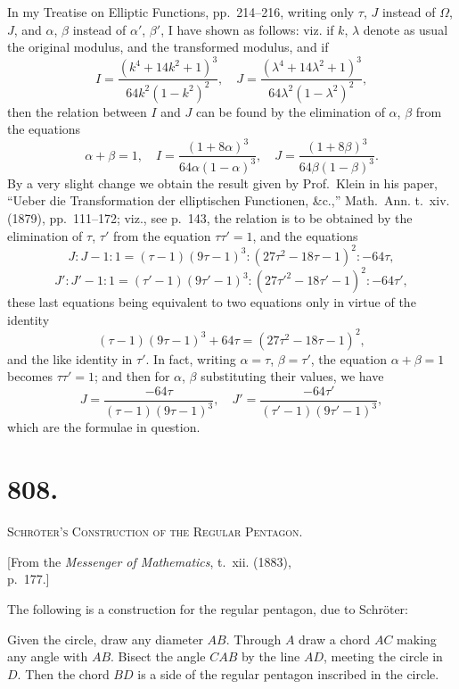 \documentclass[11pt,a4paper]{article}
\theoremstyle{definition}
\theoremstyle{remark}
\begin{document}
In my Treatise on Elliptic Functions, pp.~214--216, writing only $\tau$, $J$ instead of $\Omega$, $J$, and $\alpha$, $\beta$ instead of $\alpha'$, $\beta'$, I have shown as follows: viz. if $k$, $\lambda$ denote as usual the original modulus, and the transformed modulus, and if
\[
I = \frac{(k^4 + 14k^2 + 1)^3}{64k^2(1-k^2)^2}, \quad
J = \frac{(\lambda^4 + 14\lambda^2 + 1)^3}{64\lambda^2(1-\lambda^2)^2},
\]
then the relation between $I$ and $J$ can be found by the elimination of $\alpha$, $\beta$ from the equations
\[
\alpha + \beta = 1, \quad
I = \frac{(1 + 8\alpha)^3}{64\alpha(1-\alpha)^3}, \quad
J = \frac{(1 + 8\beta)^3}{64\beta(1-\beta)^3}.
\]
By a very slight change we obtain the result given by Prof.~Klein in his paper, ``Ueber die Transformation der elliptischen Functionen, \&c.,'' Math.~Ann. t.~xiv. (1879), pp.~111--172; viz., see p.~143, the relation is to be obtained by the elimination of $\tau$, $\tau'$ from the equation $\tau\tau' = 1$, and the equations
\[
J : J-1 : 1 = (\tau-1)(9\tau-1)^3 : (27\tau^2 - 18\tau - 1)^2 : -64\tau,
\]
\[
J' : J'-1 : 1 = (\tau'-1)(9\tau'-1)^3 : (27\tau'^2 - 18\tau' - 1)^2 : -64\tau',
\]
these last equations being equivalent to two equations only in virtue of the identity
\[
(\tau - 1)(9\tau - 1)^3 + 64\tau = (27\tau^2 - 18\tau - 1)^2,
\]
and the like identity in $\tau'$. In fact, writing $\alpha = \tau$, $\beta = \tau'$, the equation $\alpha + \beta = 1$ becomes $\tau\tau' = 1$; and then for $\alpha$, $\beta$ substituting their values, we have
\[
J = \frac{-64\tau}{(\tau-1)(9\tau-1)^3}, \quad
J' = \frac{-64\tau'}{(\tau'-1)(9\tau'-1)^3},
\]
which are the formulae in question.



\newpage
\section*{808.}
\begin{center}
{\large\scshape Schr\"{o}ter's Construction of the Regular Pentagon.}
\end{center}

\begin{flushright}
\small[From the \textit{Messenger of Mathematics}, t.~xii. (1883),\\
p.~177.]
\end{flushright}

The following is a construction for the regular pentagon, due to Schr\"{o}ter:

Given the circle, draw any diameter $AB$. Through $A$ draw a chord $AC$ making any angle with $AB$. Bisect the angle $CAB$ by the line $AD$, meeting the circle in $D$. Then the chord $BD$ is a side of the regular pentagon inscribed in the circle.
\end{document}
